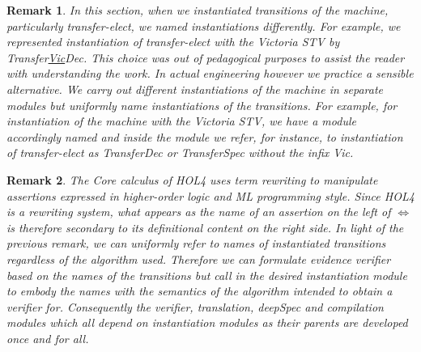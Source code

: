 \documentclass[10pt,conference]{IEEEtran}
\newtheorem{remark}{Remark}
\begin{document}
\begin{remark}\label{naming}
In this section, when we instantiated transitions of the machine, particularly transfer-elect, we named instantiations differently. For example, we represented instantiation of transfer-elect with the Victoria STV by  Transfer\underline{Vic}Dec. This choice was out of pedagogical purposes to assist the reader with understanding the work. In actual engineering however we practice a sensible alternative. We carry out different instantiations of the machine in separate modules but uniformly name instantiations of the transitions. For example, for instantiation of the machine with the Victoria STV, we have a module accordingly named and inside the module we refer, for instance, to instantiation of transfer-elect as TransferDec or TransferSpec without the infix Vic.
\end{remark}
\begin{remark}\label{rewrting}
The Core calculus of HOL4 uses \emph{term rewriting} to manipulate assertions expressed in higher-order logic and ML programming style. 
Since HOL4 is a rewriting system, what appears as the name of an assertion on the left of $\Leftrightarrow$ is therefore secondary to its definitional content on the right side. In light of the previous remark, we can uniformly refer to \emph{names} of instantiated transitions regardless of the algorithm used. Therefore we can formulate evidence verifier based on the names of the transitions but call in the desired instantiation  module to embody the names with the semantics  of the algorithm intended to obtain a verifier for. Consequently the verifier, translation, deepSpec and compilation modules which all depend on instantiation modules as their parents  are    developed once and for all.   
\end{remark}

 
\end{document}
